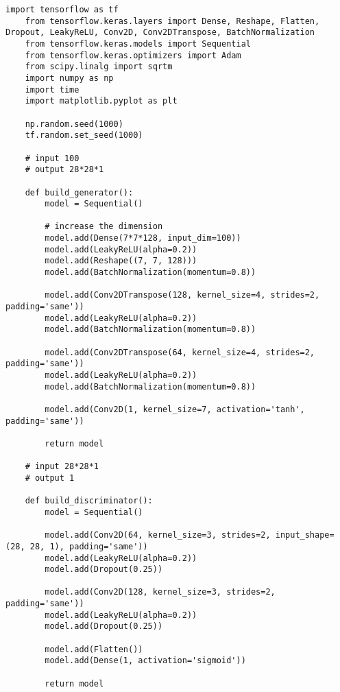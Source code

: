 \begin{lstlisting}[style=mypython, caption= { Explore Data Augmentaion (rotation 10, width and height shift 0.1 \\ and  horizontal flip)}, captionpos=t]
    import tensorflow as tf
    from tensorflow.keras.layers import Dense, Reshape, Flatten, Dropout, LeakyReLU, Conv2D, Conv2DTranspose, BatchNormalization
    from tensorflow.keras.models import Sequential
    from tensorflow.keras.optimizers import Adam
    from scipy.linalg import sqrtm
    import numpy as np
    import time
    import matplotlib.pyplot as plt
    
    np.random.seed(1000)
    tf.random.set_seed(1000)
    
    # input 100
    # output 28*28*1
    
    def build_generator():
        model = Sequential()
        
        # increase the dimension
        model.add(Dense(7*7*128, input_dim=100))
        model.add(LeakyReLU(alpha=0.2))
        model.add(Reshape((7, 7, 128)))
        model.add(BatchNormalization(momentum=0.8))
    
        model.add(Conv2DTranspose(128, kernel_size=4, strides=2, padding='same'))
        model.add(LeakyReLU(alpha=0.2))
        model.add(BatchNormalization(momentum=0.8))
    
        model.add(Conv2DTranspose(64, kernel_size=4, strides=2, padding='same'))
        model.add(LeakyReLU(alpha=0.2))
        model.add(BatchNormalization(momentum=0.8))
    
        model.add(Conv2D(1, kernel_size=7, activation='tanh', padding='same'))
    
        return model
    
    # input 28*28*1
    # output 1
    
    def build_discriminator():
        model = Sequential()
        
        model.add(Conv2D(64, kernel_size=3, strides=2, input_shape=(28, 28, 1), padding='same'))
        model.add(LeakyReLU(alpha=0.2))
        model.add(Dropout(0.25))
    
        model.add(Conv2D(128, kernel_size=3, strides=2, padding='same'))
        model.add(LeakyReLU(alpha=0.2))
        model.add(Dropout(0.25))
    
        model.add(Flatten())
        model.add(Dense(1, activation='sigmoid'))
    
        return model
    

\end{lstlisting}
